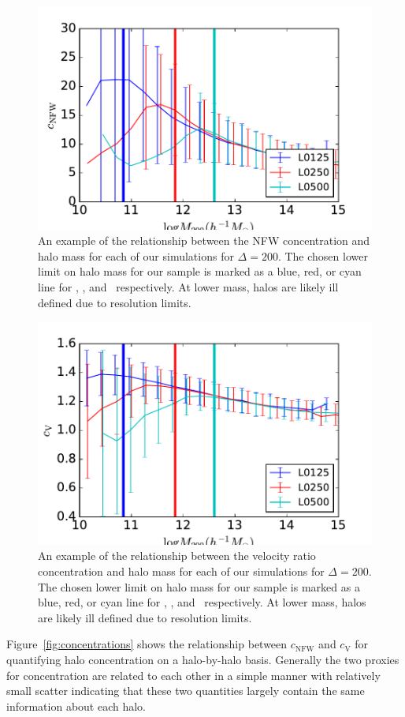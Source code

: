 \documentclass[usenatbib,usegraphicx,letterpaper]{mn2e}
\begin{document}
\begin{figure}
\centering
\includegraphics[width=.5\textwidth]{masscut_cNFW_d200.pdf}
\caption{An example of the relationship between the NFW concentration and halo mass for each of our simulations for $\Delta =200$. The chosen lower limit on halo mass for our sample is marked as a blue, red, or cyan line for \simA, \simB, and \simC \ respectively. At lower mass, halos are likely ill defined due to resolution limits.}
\label{fig:cnfwrelation}
\end{figure}


\begin{figure}
\centering
\includegraphics[width=.5\textwidth]{masscut_cV_d200.pdf}
\caption{An example of the relationship between the velocity ratio concentration and halo mass for each of our simulations for $\Delta =200$. The chosen lower limit on halo mass for our sample is marked as a blue, red, or cyan line for \simA, \simB, and \simC \ respectively. At lower mass, halos are likely ill defined due to resolution limits.}
\label{fig:cvrelation}
\end{figure}

Figure~\ref{fig:concentrations} shows the relationship between $c_{\mathrm{NFW}}$ and $c_{\mathrm{V}}$ for quantifying halo 
concentration on a halo-by-halo basis. Generally the two proxies for concentration are related to each other in a simple manner 
with relatively small scatter indicating that these two quantities largely contain the same information about each halo.
\end{document}

